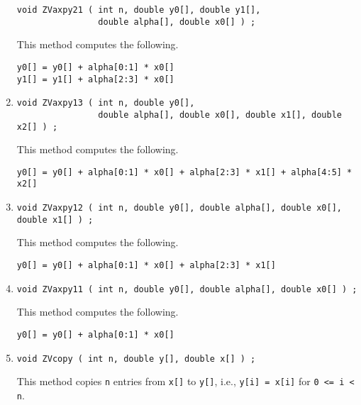 \begin{enumerate}
\begin{verbatim}
void ZVaxpy21 ( int n, double y0[], double y1[], 
                double alpha[], double x0[] ) ;
\end{verbatim}
This method computes the following.
\begin{verbatim}
y0[] = y0[] + alpha[0:1] * x0[] 
y1[] = y1[] + alpha[2:3] * x0[] 
\end{verbatim}
\item
\begin{verbatim}
void ZVaxpy13 ( int n, double y0[], 
                double alpha[], double x0[], double x1[], double x2[] ) ;
\end{verbatim}
This method computes the following.
\begin{verbatim}
y0[] = y0[] + alpha[0:1] * x0[] + alpha[2:3] * x1[] + alpha[4:5] * x2[]
\end{verbatim}
\item
\begin{verbatim}
void ZVaxpy12 ( int n, double y0[], double alpha[], double x0[], double x1[] ) ;
\end{verbatim}
This method computes the following.
\begin{verbatim}
y0[] = y0[] + alpha[0:1] * x0[] + alpha[2:3] * x1[] 
\end{verbatim}
\item
\begin{verbatim}
void ZVaxpy11 ( int n, double y0[], double alpha[], double x0[] ) ;
\end{verbatim}
This method computes the following.
\begin{verbatim}
y0[] = y0[] + alpha[0:1] * x0[] 
\end{verbatim}
\item
\begin{verbatim}
void ZVcopy ( int n, double y[], double x[] ) ;
\end{verbatim}
This method copies {\tt n} entries from {\tt x[]} to {\tt y[]},
i.e.,
{\tt y[i] = x[i]} for {\tt 0 <= i < n}.

\end{enumerate}

